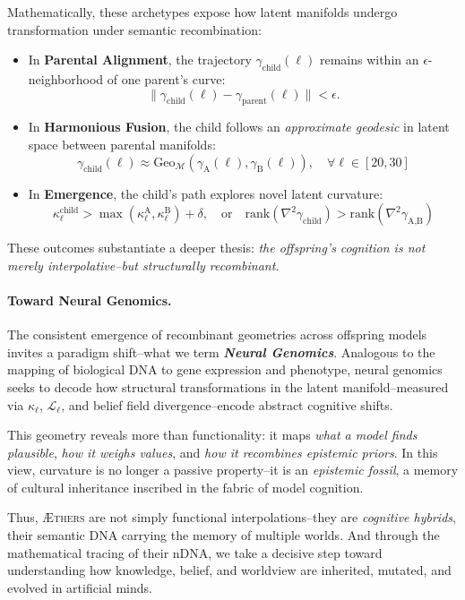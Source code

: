 Mathematically, these archetypes expose how latent manifolds undergo transformation under semantic recombination:
\begin{itemize}[leftmargin=1.5em]
    \item In \textbf{Parental Alignment}, the trajectory \(\gamma_{\text{child}}(\ell)\) remains within an \(\epsilon\)-neighborhood of one parent's curve:
    \[\boxed{
    \|\gamma_{\text{child}}(\ell) - \gamma_{\text{parent}}(\ell)\| < \epsilon.
    }
    \]
    \item In \textbf{Harmonious Fusion}, the child follows an \emph{approximate geodesic} in latent space between parental manifolds:
    \[\boxed{
    \gamma_{\text{child}}(\ell) \approx \mathrm{Geo}_{\mathcal{M}} \left( \gamma_{\text{A}}(\ell), \gamma_{\text{B}}(\ell) \right), \quad \forall \ell \in [20,30]
    }
    \]
    \item In \textbf{Emergence}, the child’s path explores novel latent curvature:
    \[\boxed{
    \kappa_\ell^{\text{child}} > \max(\kappa_\ell^{\text{A}}, \kappa_\ell^{\text{B}}) + \delta, \quad \text{or} \quad \mathrm{rank}(\nabla^2 \gamma_{\text{child}}) > \mathrm{rank}(\nabla^2 \gamma_{\text{A,B}})
    }
    \]
\end{itemize}

These outcomes substantiate a deeper thesis: \emph{the offspring's cognition is not merely interpolative--but structurally recombinant}.

\paragraph{Toward Neural Genomics.}
The consistent emergence of recombinant geometries across offspring models invites a paradigm shift--what we term \textbf{\emph{Neural Genomics}}. Analogous to the mapping of biological DNA to gene expression and phenotype, neural genomics seeks to decode how structural transformations in the latent manifold--measured via \(\kappa_\ell\), \(\mathcal{L}_\ell\), and belief field divergence--encode abstract cognitive shifts.

This geometry reveals more than functionality: it maps \emph{what a model finds plausible}, \emph{how it weighs values}, and \emph{how it recombines epistemic priors}. In this view, curvature is no longer a passive property--it is an \emph{epistemic fossil}, a memory of cultural inheritance inscribed in the fabric of model cognition.

Thus, \textsc{Æthers} are not simply functional interpolations--they are \emph{cognitive hybrids}, their semantic DNA carrying the memory of multiple worlds. And through the mathematical tracing of their nDNA, we take a decisive step toward understanding how knowledge, belief, and worldview are inherited, mutated, and evolved in artificial minds.

